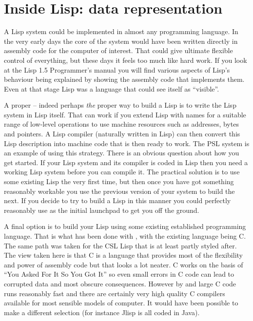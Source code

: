 \chapter{Inside Lisp: data representation}
A Lisp system could be implemented in almost any programming language.
In the very early days the core of the system would have been written directly
in assembly code for the computer of interest. That could give ultimate
flexible control of everything, but these days it feels too much like
hard work. If you look at the Lisp 1.5 Programmer's manual\cite{Lisp15}
you will find various aspects of Lisp's behaviour being explained by showing
the assembly code that implements them. Even at that stage Lisp was
a language that could see itself as ``visible''.

A proper -- indeed perhaps {\em the} proper way to
build a Lisp is to write the Lisp system in Lisp itself. That can
work if you extend Lisp with names for a suitable range of low-level
operations to use machine resources such as addresses, bytes and
pointers. A Lisp compiler (naturally written in Lisp) can then
convert this Lisp description into machine code that is then ready to
work. The PSL\cite{PSL} system is an example of using this strategy.
There is an obvious question about how you get started. If your Lisp
system and its compiler is coded in Lisp then you need a working Lisp
system before you can compile it. The practical solution is to
use some existing Lisp the very first time, but then once you have
got something reasonably workable you use the previous version of
your system to build the next. If you decide to try to build
a Lisp in this manner you could perfectly reasonably use \vsl{} as the
initial launchpad to get you off the ground.

A final option is to build your Lisp using some existing established
programming language. That is what has been done with \vsl{}, with the
existing language being C. The same path was taken for the CSL Lisp\cite{CSL}
that \vsl{} is at least partly styled after. The view taken here is that
C is a language that provides most of the flexibility and power of assembly
code but that looks a lot neater. C works on the basis of ``You Asked For
It So You Got It'' so even small errors in C code can lead to corrupted
data and most obscure consequences. However by and large C code runs reasonably
fast and there are certainly very high quality C compilers available for
most sensible models of computer. It would have been possible to make a
different selection (for instance Jlisp\cite{Jlisp} is all coded in Java).

